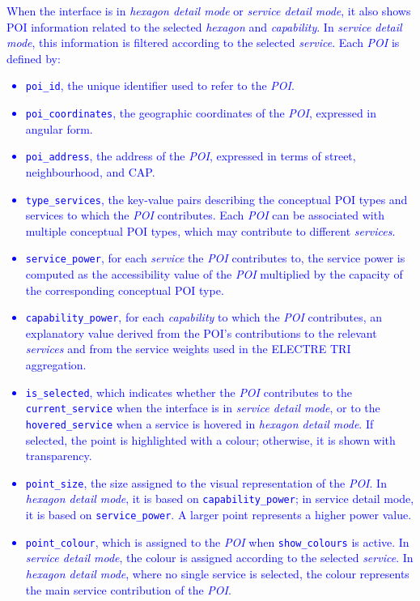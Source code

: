 \documentclass{article}
\newcommand{\mm}[1]{\textcolor{blue}{#1}}
\begin{document}
\mm{
When the interface is in \emph{hexagon detail mode} or \emph{service detail mode}, it also shows POI information related to the selected \emph{hexagon} and \emph{capability}. In \emph{service detail mode}, this information is filtered according to the selected \emph{service}. Each \emph{POI} is defined by:
\begin{itemize}
    \item \texttt{poi\_id}, the unique identifier used to refer to the \emph{POI}.
    \item \texttt{poi\_coordinates}, the geographic coordinates of the \emph{POI}, expressed in angular form.
    \item \texttt{poi\_address}, the address of the \emph{POI}, expressed in terms of street, neighbourhood, and CAP.
    \item \texttt{type\_services}, the key-value pairs describing the conceptual POI types and services to which the \emph{POI} contributes. Each \emph{POI} can be associated with multiple conceptual POI types, which may contribute to different \emph{services}.
    \item \texttt{service\_power}, for each \emph{service} the \emph{POI} contributes to, the service power is computed as the accessibility value of the \emph{POI} multiplied by the capacity of the corresponding conceptual POI type.
    \item \texttt{capability\_power}, for each \emph{capability} to which the
    \emph{POI} contributes, an explanatory value derived from the POI's
    contributions to the relevant \emph{services} and from the service weights
    used in the ELECTRE TRI aggregation.
   \item \texttt{is\_selected}, which indicates whether the \emph{POI} contributes to the \texttt{current\_service} when the interface is in \emph{service detail mode}, or to the \texttt{hovered\_service} when a service is hovered in \emph{hexagon detail mode}. If selected, the point is highlighted with a colour; otherwise, it is shown with transparency.
    \item \texttt{point\_size}, the size assigned to the visual representation of the \emph{POI}. In \emph{hexagon detail mode}, it is based on \texttt{capability\_power}; in service detail mode, it is based on \texttt{service\_power}. A larger point represents a higher power value.
    \item \texttt{point\_colour}, which is assigned to the \emph{POI} when \texttt{show\_colours} is active. In \emph{service detail mode}, the colour is assigned according to the selected \emph{service}. In \emph{hexagon detail mode}, where no single service is selected, the colour represents the main service contribution of the \emph{POI}.
\end{itemize}
}
\end{document}
